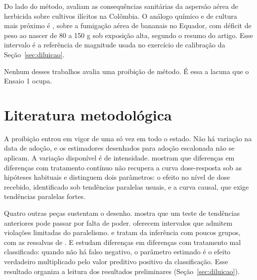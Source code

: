 Do lado do método, \citet{camacho2017health} avaliam as consequências
sanitárias da aspersão aérea de herbicida sobre cultivos ilícitos na Colômbia.
O análogo químico e de cultura mais próximo é \citet{calzada2023bananas}, sobre
a fumigação aérea de bananais no Equador, com déficit de peso ao nascer de 80 a
150 g sob exposição alta, segundo o resumo do artigo. Esse intervalo é a
referência de magnitude usada no exercício de calibração da
Seção~\ref{sec:diluicao}.

Nenhum desses trabalhos avalia uma proibição de método. É essa a lacuna que o
Ensaio 1 ocupa.

\section{Literatura metodológica}
\label{sec:metodo-lit}

A proibição entrou em vigor de uma só vez em todo o estado. Não há variação na
data de adoção, e os estimadores desenhados para adoção escalonada
\cite{callaway2021multiple,goodmanbacon2021,dechaisemartin2020} não se aplicam.
A variação disponível é de intensidade. \citet{callaway2024continuous} mostram
que diferenças em diferenças com tratamento contínuo não recupera a curva
dose-resposta sob as hipóteses habituais e distinguem dois parâmetros: o efeito
no nível de dose recebido, identificado sob tendências paralelas usuais, e a
curva causal, que exige tendências paralelas fortes.

Quatro outras peças sustentam o desenho. \citet{roth2023trending} mostra que um
teste de tendências anteriores pode passar por falta de poder.
\citet{rambachan2023credible} oferecem intervalos que admitem violações
limitadas do paralelismo. \citet{conley2011} e \citet{cameron2008wild} tratam
da inferência com poucos grupos, com as ressalvas de \citet{canay2021wild}. E
\citet{denteh2022misclassification} estudam diferenças em diferenças com
tratamento mal classificado: quando não há falso negativo, o parâmetro estimado
é o efeito verdadeiro multiplicado pelo valor preditivo positivo da
classificação. Esse resultado organiza a leitura dos resultados preliminares
(Seção~\ref{sec:diluicao}).
